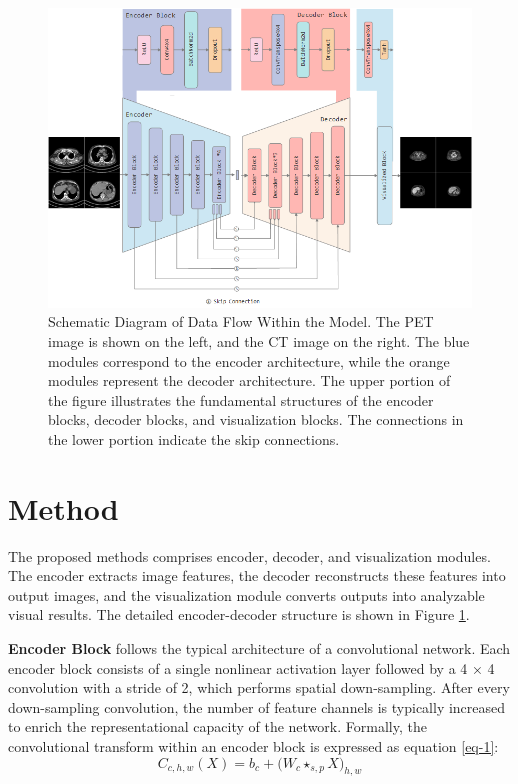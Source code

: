 \documentclass[a4paper, times, 10pt,twocolumn]{article}
\begin{document}
\begin{figure}[t!]
	\centering
	\includegraphics[width=1.0\linewidth]{u-net/lung/Encoder-Decoder-5layer-250406}
	\caption[architecture]{Schematic Diagram of Data Flow Within the Model. The PET image is shown on the left, and the CT image on the right. The blue modules correspond to the encoder architecture, while the orange modules represent the decoder architecture. The upper portion of the figure illustrates the fundamental structures of the encoder blocks, decoder blocks, and visualization blocks. The connections in the lower portion indicate the skip connections.}
	\label{fig:Encoder_Decoder_Pair}
\end{figure}

\section{Method}
The proposed methods comprises encoder, decoder, and visualization modules. The encoder extracts image features, the decoder reconstructs these features into output images, and the visualization module converts outputs into analyzable visual results. The detailed encoder-decoder structure is shown in Figure \ref{fig:Encoder_Decoder_Pair}.

\textbf{Encoder Block} follows the typical architecture of a convolutional network.
Each encoder block consists of a single nonlinear activation layer followed by a 4 × 4 convolution with a stride of 2, which performs spatial down-sampling. After every down-sampling convolution, the number of feature channels is typically increased to enrich the representational capacity of the network. Formally, the convolutional transform within an encoder block is expressed as equation \eqref{eq-1}:
\begin{equation}
	\label{eq-1}
	C_{c,h,w}(X)= b_{c} + \bigl(W_{c} \star_{s,p} X\bigr)_{h,w}
\end{equation}
\end{document}
